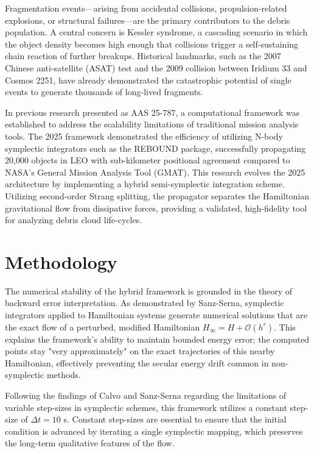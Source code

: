\documentclass[letterpaper, paper,11pt]{AAS}
\begin{document}
Fragmentation events—arising from accidental collisions, propulsion-related explosions, or structural failures—are the primary contributors to the debris population\cite{puerta-ibarra_advanced_nodate}. A central concern is Kessler syndrome, a cascading scenario in which the object density becomes high enough that collisions trigger a self-sustaining chain reaction of further breakups\cite{kessler_collision_1978}. Historical landmarks, such as the 2007 Chinese anti-satellite (ASAT) test and the 2009 collision between Iridium 33 and Cosmos 2251, have already demonstrated the catastrophic potential of single events to generate thousands of long-lived fragments\cite{wang_analysis_2010}. 

In previous research presented as AAS 25-787, a computational framework was established to address the scalability limitations of traditional mission analysis tools\cite{puerta-ibarra_advanced_nodate}. The 2025 framework demonstrated the efficiency of utilizing N-body symplectic integrators such as the REBOUND package, successfully propagating 20,000 objects in LEO with sub-kilometer positional agreement compared to NASA's General Mission Analysis Tool (GMAT)\cite{puerta-ibarra_advanced_nodate}. This research evolves the 2025 architecture by implementing a hybrid semi-symplectic integration scheme. Utilizing second-order Strang splitting, the propagator separates the Hamiltonian gravitational flow from dissipative forces, providing a validated, high-fidelity tool for analyzing debris cloud life-cycles.

\section{Methodology}
The numerical stability of the hybrid framework is grounded in the theory of backward error interpretation. As demonstrated by Sanz-Serna\cite{sanz-serna_symplectic_1992}, symplectic integrators applied to Hamiltonian systems generate numerical solutions that are the exact flow of a perturbed, modified Hamiltonian $H_{\infty} = H + \mathcal{O}(h^r)$. This explains the framework's ability to maintain bounded energy error; the computed points stay "very approximately" on the exact trajectories of this nearby Hamiltonian, effectively preventing the secular energy drift common in non-symplectic methods\cite{sanz-serna_symplectic_1992}.

Following the findings of Calvo and Sanz-Serna regarding the limitations of variable step-sizes in symplectic schemes, this framework utilizes a constant step-size of $\Delta t = 10$ s\cite{sanz-serna_symplectic_1992}. Constant step-sizes are essential to ensure that the initial condition is advanced by iterating a single symplectic mapping, which preserves the long-term qualitative features of the flow\cite{sanz-serna_symplectic_1992}.
\end{document}
